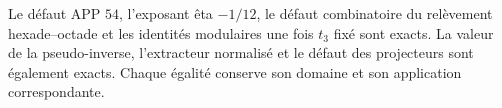 \begin{remark}
Le défaut APP \(54\), l’exposant êta \(-1/12\), le défaut
combinatoire du relèvement hexade--octade et les
identités modulaires une fois \(t_3\) fixé sont exacts. La valeur
de la pseudo-inverse, l’extracteur normalisé et le défaut des projecteurs sont également exacts.
Chaque égalité conserve son domaine et son application correspondante.
\end{remark}
